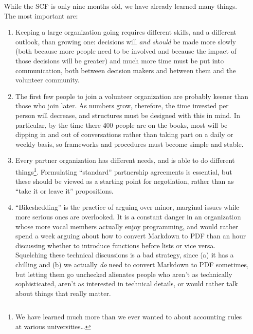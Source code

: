\documentclass[10pt,a4paper,twocolumn]{article}
\begin{document}
While the SCF is only nine months old, we have already learned many
things.  The most important are:

\begin{enumerate}

\item
  Keeping a large organization going requires different skills, and a
  different outlook, than growing one: decisions will \emph{and
  should} be made more slowly (both because more people need to be
  involved and because the impact of those decisions will be greater)
  and much more time must be put into communication, both between
  decision makers and between them and the volunteer community.

\item
  The first few people to join a volunteer organization are probably
  keener than those who join later.  As numbers grow, therefore, the
  time invested per person will decrease, and structures must be
  designed with this in mind.  In particular, by the time there 400
  people are on the books, most will be dipping in and out of
  conversations rather than taking part on a daily or weekly basis, so
  frameworks and procedures must become simple and stable.

\item
  Every partner organization has different needs, and is able to do
  different things\footnote{We have learned much more than we ever
  wanted to about accounting rules at various universities\ldots}.
  Formulating ``standard'' partnership agreements is essential, but
  these should be viewed as a starting point for negotiation, rather
  than as ``take it or leave it'' propositions.

\item
  ``Bikeshedding'' is the practice of arguing over minor, marginal
  issues while more serious ones are overlooked.  It is a constant
  danger in an organization whose more vocal members actually enjoy
  programming, and would rather spend a week arguing about how to
  convert Markdown to PDF than an hour discussing whether to introduce
  functions before lists or vice versa.  Squelching these technical
  discussions is a bad strategy, since (a) it has a chilling and (b)
  we actually \emph{do} need to convert Markdown to PDF sometimes, but
  letting them go unchecked alienates people who aren't as technically
  sophisticated, aren't as interested in technical details, or would
  rather talk about things that really matter.

\end{enumerate}
\end{document}
